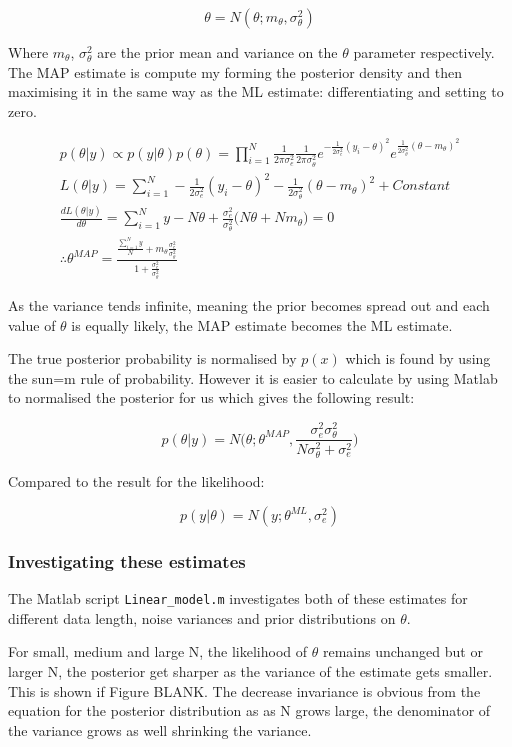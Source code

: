\documentclass[12pt]{article}
\begin{document}
\[\theta = N(\theta; m_{\theta}, \sigma_{\theta}^2) \]

Where $m_{\theta}$, $\sigma_{\theta}^2$ are the prior mean and variance on the $\theta$ parameter respectively. The MAP estimate is compute my forming the posterior density and then maximising it in the same way as the ML estimate: differentiating and setting to zero.  

\begin{gather*}
p(\theta|y) \propto p(y|\theta)p(\theta) = \prod_{i=1}^N \frac{1}{2\pi\sigma_e^2} \frac{1}{2\pi\sigma_{\theta}^2} e^{-\frac{1}{2\sigma_e^2}(y_i-\theta)^2}e^{\frac{1}{2\sigma_{\theta}^2}(\theta-m_{\theta})^2}
\\
L(\theta|y) = \sum_{i=1}^N -\frac{1}{2\sigma_e^2}(y_i-\theta)^2 -\frac{1}{2\sigma_{\theta}^2}(\theta-m_{\theta})^2 + Constant
\\
\frac{dL(\theta|y)}{d\theta} = \sum_{i=1}^N y-N\theta + \frac{\sigma_e^2}{\sigma^2_{\theta}} \Bigg(N\theta + Nm_{\theta} \Bigg) = 0
\\
\therefore \theta^{MAP} = \frac{\frac{\sum_{i=1}^N y}{N}+ m_{\theta} \frac{\sigma_e^2}{\sigma^2_{\theta}}}{1+ \frac{\sigma_e^2}{\sigma^2_{\theta}}}
\end{gather*}

As the variance tends infinite, meaning the prior becomes spread out and each value of $\theta$ is equally likely, the MAP estimate becomes the ML estimate.

The true posterior probability is normalised by $p(x)$ which is found by using the sun=m rule of probability. However it is easier to calculate by using Matlab to normalised the posterior for us which gives the following result:

\[p(\theta|y) = N\Big(\theta; \theta^{MAP}, \frac{\sigma_e^2\sigma_{\theta}^2}{N\sigma_{\theta}^2+\sigma_e^2}\Big)
\]

Compared to the result for the likelihood:

\[ p(y|\theta) = N(y;\theta^{ML}, \sigma_e^2) \]

\subsubsection{Investigating these estimates}
The Matlab script \texttt{Linear\_model.m} investigates both of these estimates for different data length, noise variances and prior distributions on $\theta$.

For small, medium and large N, the likelihood of $\theta$ remains unchanged but or larger N, the posterior get sharper as the variance of the estimate gets smaller. This is shown if Figure BLANK. The decrease invariance is obvious from the equation for the posterior distribution as as N grows large, the denominator of the variance grows as well shrinking the variance.
\end{document}
